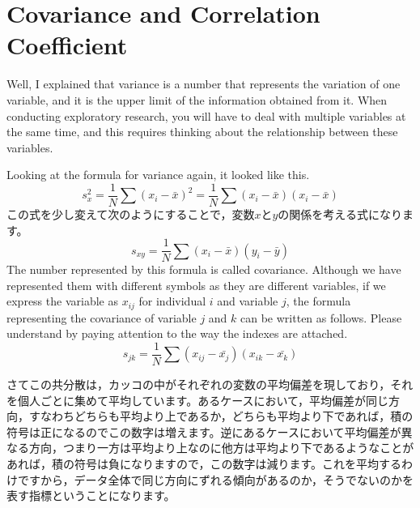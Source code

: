 \documentclass{ltjsbook}
\begin{document}
\section{Covariance and Correlation Coefficient}
Well, I explained that variance is a number that represents the variation of one variable, and it is the upper limit of the information obtained from it.
When conducting exploratory research, you will have to deal with multiple variables at the same time, and this requires thinking about the relationship between these variables.

Looking at the formula for variance again, it looked like this.
\[  s_x^2 = \frac{1}{N}\sum (x_i - \bar{x})^2 = \frac{1}{N}\sum (x_i - \bar{x})(x_i - \bar{x}) \]
この式を少し変えて次のようにすることで，変数$x$と$y$の関係を考える式になります。
\[ s_{xy} = \frac{1}{N} \sum(x_i-\bar{x})(y_i-\bar{y})\]
The number represented by this formula is called covariance. Although we have represented them with different symbols as they are different variables, if we express the variable as $x_{ij}$ for individual $i$ and variable $j$, the formula representing the covariance of variable $j$ and $k$ can be written as follows. Please understand by paying attention to the way the indexes are attached.
\[ s_{jk} = \frac{1}{N} \sum (x_{ij} - \bar{x_j})(x_{ik} - \bar{x_k}) \]

さてこの共分散は，カッコの中がそれぞれの変数の平均偏差を現しており，それを個人ごとに集めて平均しています。あるケースにおいて，平均偏差が同じ方向，すなわちどちらも平均より上であるか，どちらも平均より下であれば，積の符号は正になるのでこの数字は増えます。逆にあるケースにおいて平均偏差が異なる方向，つまり一方は平均より上なのに他方は平均より下であるようなことがあれば，積の符号は負になりますので，この数字は減ります。これを平均するわけですから，データ全体で同じ方向にずれる傾向があるのか，そうでないのかを表す指標ということになります。
\end{document}
